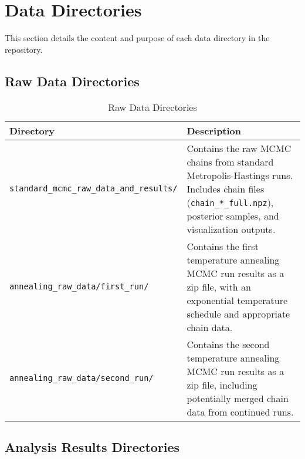 \documentclass[11pt]{article}
\begin{document}
\section{Data Directories}

This section details the content and purpose of each data directory in the repository.

\subsection{Raw Data Directories}

\begin{table}[H]
\centering
\begin{tabular}{p{5cm}p{10cm}}
\toprule
\textbf{Directory} & \textbf{Description} \\
\midrule
\texttt{standard\_mcmc\_raw\_data\_and\_results/} & Contains the raw MCMC chains from standard Metropolis-Hastings runs. Includes chain files (\texttt{chain\_*\_full.npz}), posterior samples, and visualization outputs. \\
\addlinespace
\texttt{annealing\_raw\_data/first\_run/} & Contains the first temperature annealing MCMC run results as a zip file, with an exponential temperature schedule and appropriate chain data. \\
\addlinespace
\texttt{annealing\_raw\_data/second\_run/} & Contains the second temperature annealing MCMC run results as a zip file, including potentially merged chain data from continued runs. \\
\bottomrule
\end{tabular}
\caption{Raw Data Directories}
\label{tab:raw-data-dirs}
\end{table}

\subsection{Analysis Results Directories}
\end{document}
